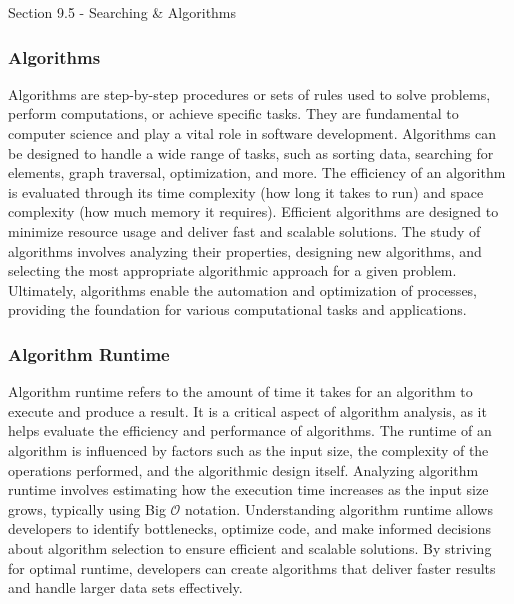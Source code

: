 \begin{notes}{Section 9.5 - Searching \& Algorithms}
    \subsubsection*{Algorithms}

    Algorithms are step-by-step procedures or sets of rules used to solve problems, perform computations, or achieve specific tasks. They are fundamental to computer science and play a vital role in software development. Algorithms can be designed to handle a wide range of tasks, such as sorting data, searching for elements, graph traversal, optimization, and more. The efficiency of an algorithm is evaluated through its time complexity (how long it takes to run) 
    and space complexity (how much memory it requires). Efficient algorithms are designed to minimize resource usage and deliver fast and scalable solutions. The study of algorithms involves analyzing their properties, designing new algorithms, and selecting the most appropriate algorithmic approach for a given problem. Ultimately, algorithms enable the automation and optimization of processes, providing the foundation for various computational tasks and applications.
    
    \subsubsection*{Algorithm Runtime}
    
    Algorithm runtime refers to the amount of time it takes for an algorithm to execute and produce a result. It is a critical aspect of algorithm analysis, as it helps evaluate the efficiency and performance of algorithms. The runtime of an algorithm is influenced by factors such as the input size, the complexity of the operations performed, and the algorithmic design itself. Analyzing algorithm runtime involves estimating how the execution time increases as the input 
    size grows, typically using Big $\mathcal{O}$ notation. Understanding algorithm runtime allows developers to identify bottlenecks, optimize code, and make informed decisions about algorithm selection to ensure efficient and scalable solutions. By striving for optimal runtime, developers can create algorithms that deliver faster results and handle larger data sets effectively.
\end{notes}

